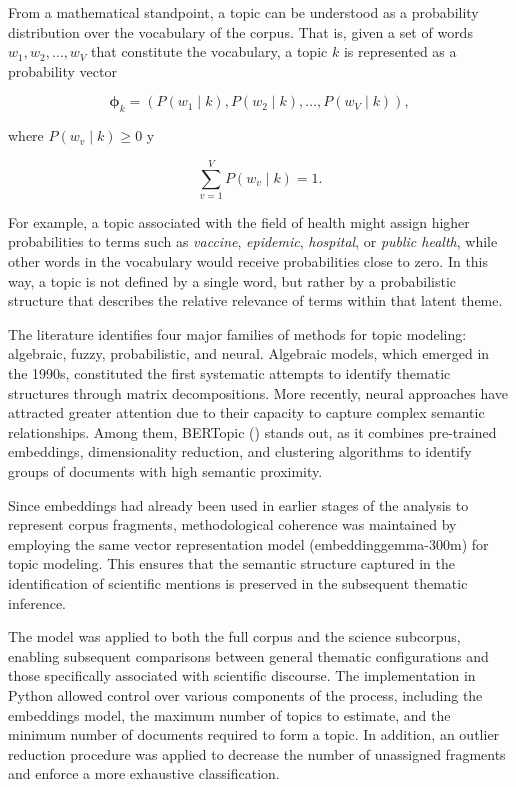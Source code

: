 \documentclass[11pt,a4paper]{article}
\begin{document}
	From a mathematical standpoint, a topic can be understood as a probability distribution over the vocabulary of the corpus. That is, given a set of words $w_1, w_2, \dots, w_V$ that constitute the vocabulary, a topic $k$ is represented as a probability vector

	$$
	\boldsymbol{\phi}_k = \left( P(w_1 \mid k), P(w_2 \mid k), \dots, P(w_V \mid k) \right),
	$$
	
	where $P(w_v \mid k) \ge 0$ y
	
	$$
	\sum_{v=1}^{V} P(w_v \mid k) = 1.
	$$
	
	For example, a topic associated with the field of health might assign higher probabilities to terms such as \textit{vaccine}, \textit{epidemic}, \textit{hospital}, or \textit{public health}, while other words in the vocabulary would receive probabilities close to zero. In this way, a topic is not defined by a single word, but rather by a probabilistic structure that describes the relative relevance of terms within that latent theme.
	
	The literature identifies four major families of methods for topic modeling: algebraic, fuzzy, probabilistic, and neural. Algebraic models, which emerged in the 1990s, constituted the first systematic attempts to identify thematic structures through matrix decompositions. More recently, neural approaches have attracted greater attention due to their capacity to capture complex semantic relationships. Among them, BERTopic (\cite{Grootendorst2022}) stands out, as it combines pre-trained embeddings, dimensionality reduction, and clustering algorithms to identify groups of documents with high semantic proximity.
	
	Since embeddings had already been used in earlier stages of the analysis to represent corpus fragments, methodological coherence was maintained by employing the same vector representation model (embeddinggemma-300m) for topic modeling. This ensures that the semantic structure captured in the identification of scientific mentions is preserved in the subsequent thematic inference.
	
	The model was applied to both the full corpus and the science subcorpus, enabling subsequent comparisons between general thematic configurations and those specifically associated with scientific discourse. The implementation in Python allowed control over various components of the process, including the embeddings model, the maximum number of topics to estimate, and the minimum number of documents required to form a topic. In addition, an outlier reduction procedure was applied to decrease the number of unassigned fragments and enforce a more exhaustive classification.
	
\end{document}
